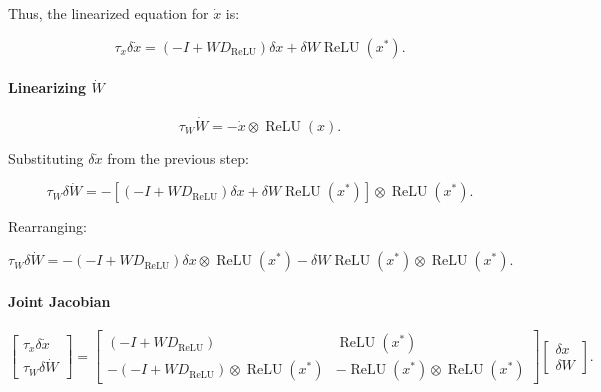 \documentclass{article}
\theoremstyle{definition} \newtheorem{definition}{Definition}
\theoremstyle{remark} \newtheorem{remark}{Remark}
\begin{document}
Thus, the linearized equation for \( \dot{x} \) is:

\begin{equation}
    \tau_x \delta \dot{x} = (-I + W D_{\operatorname{ReLU}}) \delta x + \delta W \operatorname{ReLU}(x^*).
\end{equation}


\paragraph{Linearizing $\dot W$}

\begin{equation}
    \tau_W \dot{W} = - \dot{x} \otimes \operatorname{ReLU}(x).
\end{equation}

Substituting \( \delta \dot{x} \) from the previous step:

\begin{equation}
    \tau_W \delta \dot{W} = -\left[ (-I + W D_{\operatorname{ReLU}}) \delta x + \delta W \operatorname{ReLU}(x^*) \right] \otimes \operatorname{ReLU}(x^*).
\end{equation}

Rearranging:

\begin{equation}
    \tau_W \delta \dot{W} = - (-I + W D_{\operatorname{ReLU}}) \delta x \otimes \operatorname{ReLU}(x^*) 
    - \delta W \operatorname{ReLU}(x^*) \otimes \operatorname{ReLU}(x^*).
\end{equation}


\paragraph{Joint Jacobian}
\begin{equation}
\begin{bmatrix}
    \tau_x \delta \dot{x} \\
    \tau_W \delta \dot{W}
\end{bmatrix}
=
\begin{bmatrix}
    (-I + W D_{\operatorname{ReLU}}) & \operatorname{ReLU}(x^*) \\
    -(-I + W D_{\operatorname{ReLU}}) \otimes \operatorname{ReLU}(x^*) & -\operatorname{ReLU}(x^*) \otimes \operatorname{ReLU}(x^*)
\end{bmatrix}
\begin{bmatrix}
    \delta x \\
    \delta W
\end{bmatrix}.
\end{equation}
\end{document}
